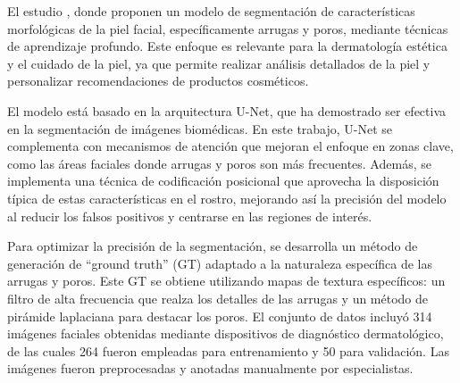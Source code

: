 

El estudio , donde \cite{yoon2023} proponen un modelo de segmentación de características morfológicas de la piel facial, específicamente arrugas y poros, mediante técnicas de aprendizaje profundo. Este enfoque es relevante para la dermatología estética y el cuidado de la piel, ya que permite realizar análisis detallados de la piel y personalizar recomendaciones de productos cosméticos.

El modelo está basado en la arquitectura U-Net, que ha demostrado ser efectiva en la segmentación de imágenes biomédicas. En este trabajo, U-Net se complementa con mecanismos de atención que mejoran el enfoque en zonas clave, como las áreas faciales donde arrugas y poros son más frecuentes. Además, se implementa una técnica de codificación posicional que aprovecha la disposición típica de estas características en el rostro, mejorando así la precisión del modelo al reducir los falsos positivos y centrarse en las regiones de interés.

Para optimizar la precisión de la segmentación, se desarrolla un método de generación de “ground truth” (GT) adaptado a la naturaleza específica de las arrugas y poros. Este GT se obtiene utilizando mapas de textura específicos: un filtro de alta frecuencia que realza los detalles de las arrugas y un método de pirámide laplaciana para destacar los poros. El conjunto de datos incluyó 314 imágenes faciales obtenidas mediante dispositivos de diagnóstico dermatológico, de las cuales 264 fueron empleadas para entrenamiento y 50 para validación. Las imágenes fueron preprocesadas y anotadas manualmente por especialistas.

